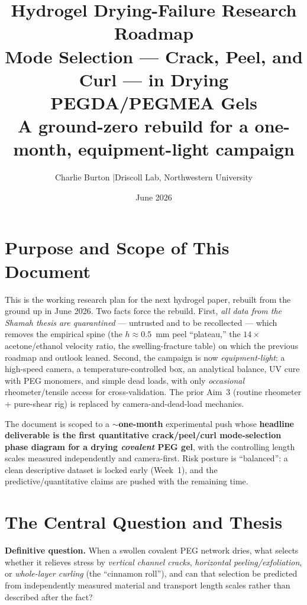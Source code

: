 \documentclass[12pt,letterpaper]{article}
\title{\textbf{Hydrogel Drying-Failure Research Roadmap}\\[0.4em]
\large Mode Selection --- Crack, Peel, and Curl --- in Drying PEGDA/PEGMEA Gels\\[0.2em]
\normalsize A ground-zero rebuild for a one-month, equipment-light campaign}
\author{Charlie Burton \quad|\quad Driscoll Lab, Northwestern University}
\date{June 2026}
\begin{document}
\maketitle
\tableofcontents
\bigskip

\section*{Purpose and Scope of This Document}
This is the working research plan for the next hydrogel paper, rebuilt from the
ground up in June 2026. Two facts force the rebuild. First, \emph{all data from
the Shamah thesis are quarantined} --- untrusted and to be recollected --- which
removes the empirical spine (the $h\!\approx\!0.5$~mm peel ``plateau,'' the
$14\times$ acetone/ethanol velocity ratio, the swelling-fracture table) on which
the previous roadmap and outlook leaned. Second, the campaign is now
\emph{equipment-light}: a high-speed camera, a temperature-controlled box, an
analytical balance, UV cure with PEG monomers, and simple dead loads, with only
\emph{occasional} rheometer/tensile access for cross-validation. The prior Aim~3
(routine rheometer $+$ pure-shear rig) is replaced by camera-and-dead-load
mechanics.

The document is scoped to a \textbf{$\sim$one-month} experimental push whose
\textbf{headline deliverable is the first quantitative crack/peel/curl
mode-selection phase diagram for a drying \emph{covalent} PEG gel}, with the
controlling length scales measured independently and camera-first. Risk posture
is ``balanced'': a clean descriptive dataset is locked early (Week~1), and the
predictive/quantitative claims are pushed with the remaining time.

\section{The Central Question and Thesis}
\begin{reviewbox}
\textbf{Definitive question.} When a swollen covalent PEG network dries, what
selects whether it relieves stress by \emph{vertical channel cracks},
\emph{horizontal peeling/exfoliation}, or \emph{whole-layer curling} (the
``cinnamon roll''), and can that selection be predicted from independently
measured material and transport length scales rather than described after the
fact?
\end{reviewbox}
\end{document}
